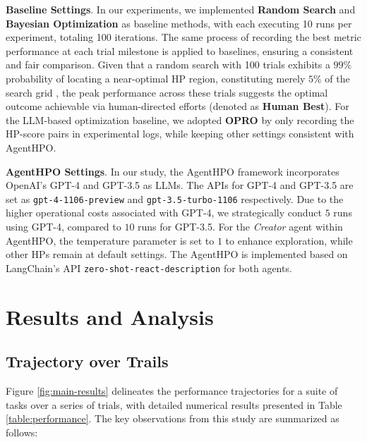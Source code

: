 \documentclass{article}
\begin{document}
\textbf{Baseline Settings}. 
In our experiments, we implemented \textbf{Random Search} and \textbf{Bayesian Optimization} \cite{shahriari2015taking} as baseline methods, with each executing 10 runs per experiment, totaling 100 iterations. The same process of recording the best metric performance at each trial milestone is applied to baselines, ensuring a consistent and fair comparison. Given that a random search with 100 trials exhibits a $99\%$ probability of locating a near-optimal HP region, constituting merely $5\%$ of the search grid \cite{liao2022empirical}, the peak performance across these trials suggests the optimal outcome achievable via human-directed efforts (denoted as \textbf{Human Best}). For the LLM-based optimization baseline, we adopted \textbf{OPRO} \cite{yang2023large} by only recording the HP-score pairs in experimental logs, while keeping other settings consistent with AgentHPO. 

\textbf{AgentHPO Settings}. In our study, the AgentHPO framework incorporates OpenAI's GPT-4 and GPT-3.5 as LLMs. The APIs for GPT-4 and GPT-3.5 are set as \texttt{gpt-4-1106-preview} %
and \texttt{gpt-3.5-turbo-1106}
respectively. Due to the higher operational costs associated with GPT-4, we strategically conduct $5$ runs using GPT-4, compared to $10$ runs for GPT-3.5. For the \textit{Creator} agent within AgentHPO, the temperature parameter is set to $1$ to enhance exploration, while other HPs remain at default settings. The AgentHPO is implemented based on LangChain's API \texttt{zero-shot-react-description} for both agents.


\section{Results and Analysis}


\subsection{Trajectory over Trails}


Figure \ref{fig:main-results} delineates the performance trajectories for a suite of tasks over a series of trials, with detailed numerical results presented in Table \ref{table:performance}. The key observations from this study are summarized as follows:
\end{document}
